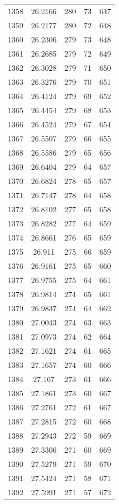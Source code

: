 \documentclass[12pt,a4paper]{article}
\begin{document}
\begin{tabular}{r|cccc}
	1358 & 26.2166 & 280 & 73 & 647 \\
	1359 & 26.2177 & 280 & 72 & 648 \\
	1360 & 26.2306 & 279 & 73 & 648 \\
	1361 & 26.2685 & 279 & 72 & 649 \\
	1362 & 26.3028 & 279 & 71 & 650 \\
	1363 & 26.3276 & 279 & 70 & 651 \\
	1364 & 26.4124 & 279 & 69 & 652 \\
	1365 & 26.4454 & 279 & 68 & 653 \\
	1366 & 26.4524 & 279 & 67 & 654 \\
	1367 & 26.5507 & 279 & 66 & 655 \\
	1368 & 26.5586 & 279 & 65 & 656 \\
	1369 & 26.6404 & 279 & 64 & 657 \\
	1370 & 26.6824 & 278 & 65 & 657 \\
	1371 & 26.7147 & 278 & 64 & 658 \\
	1372 & 26.8102 & 277 & 65 & 658 \\
	1373 & 26.8282 & 277 & 64 & 659 \\
	1374 & 26.8661 & 276 & 65 & 659 \\
	1375 & 26.911 & 275 & 66 & 659 \\
	1376 & 26.9161 & 275 & 65 & 660 \\
	1377 & 26.9755 & 275 & 64 & 661 \\
	1378 & 26.9814 & 274 & 65 & 661 \\
	1379 & 26.9837 & 274 & 64 & 662 \\
	1380 & 27.0043 & 274 & 63 & 663 \\
	1381 & 27.0973 & 274 & 62 & 664 \\
	1382 & 27.1621 & 274 & 61 & 665 \\
	1383 & 27.1657 & 274 & 60 & 666 \\
	1384 & 27.167 & 273 & 61 & 666 \\
	1385 & 27.1861 & 273 & 60 & 667 \\
	1386 & 27.2761 & 272 & 61 & 667 \\
	1387 & 27.2815 & 272 & 60 & 668 \\
	1388 & 27.2943 & 272 & 59 & 669 \\
	1389 & 27.3306 & 271 & 60 & 669 \\
	1390 & 27.5279 & 271 & 59 & 670 \\
	1391 & 27.5424 & 271 & 58 & 671 \\
	1392 & 27.5991 & 271 & 57 & 672 \\

\end{tabular}
\end{document}
